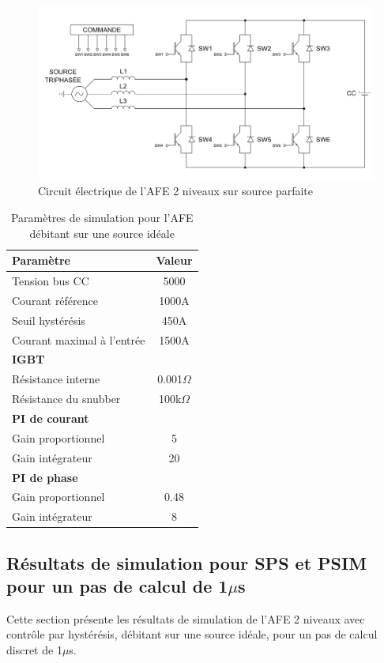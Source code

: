 \begin{figure}[htb]
\centering
\includegraphics[scale=0.6]{fig/AFE_IDEAL.png}
\caption{Circuit électrique de l'AFE 2 niveaux sur source parfaite}
\label{circuit_AFE_IDEAL}
\end{figure}


\begin{table}[htb]
\centering
\begin{tabular}{|l|c|} 
  \hline
  \textbf{Paramètre} & \textbf{Valeur}  \\
  \hline\hline
  Tension bus CC & 5000\\ \hline
  Courant référence & 1000A\\ \hline
  Seuil hystérésis & 450A\\ \hline
  Courant maximal à l'entrée& 1500A \\ \hline \hline
  \multicolumn{2}{|l|}{\textbf{IGBT}}\\ \hline
  Résistance interne & 0.001$\Omega$\\
  Résistance du snubber & 100k$\Omega$\\ \hline \hline
   \multicolumn{2}{|l|}{\textbf{PI de courant}}\\ \hline
  Gain proportionnel & 5 \\
  Gain intégrateur & 20 \\ \hline \hline
  \multicolumn{2}{|l|}{\textbf{PI de phase}}\\ \hline
  Gain proportionnel & 0.48 \\
  Gain intégrateur & 8 \\ \hline \hline
  \hline
\end{tabular}
\caption{Paramètres de simulation pour l'AFE débitant sur une source idéale}
\label{p_AF_ID}
\end{table}
\clearpage

\subsection{Résultats de simulation pour SPS et PSIM pour un pas de calcul de 1$\mu$s}
Cette section présente les résultats de simulation de l'AFE 2 niveaux avec contrôle par hystérésis, débitant sur une source idéale, pour un pas de calcul discret de 1$\mu$s. 


